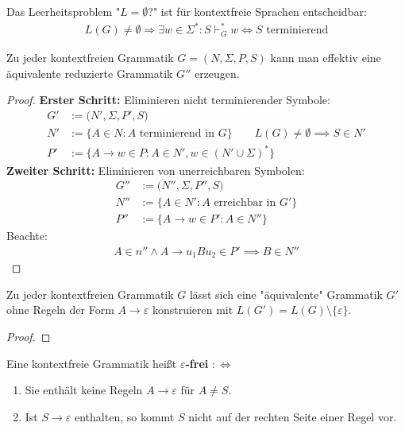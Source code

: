 \begin{satz}\label{satz8.5}
	Das Leerheitsproblem "$L=\emptyset$?" ist für kontextfreie Sprachen entscheidbar:
	\begin{align*}
		L(G)\neq\emptyset\Longrightarrow\exists w\in\Sigma^\ast:S\vdash_G^\ast w
		\Longleftrightarrow S\text{ terminierend}
	\end{align*}
\end{satz}

\begin{lemma}\label{lemma8.6}
	Zu jeder kontextfreien Grammatik $G=(N,\Sigma,P,S)$ kann man effektiv eine äquivalente reduzierte Grammatik $G''$ erzeugen.
\end{lemma}

\begin{proof}
	\textbf{Erster Schritt:} Eliminieren nicht terminierender Symbole:
	\begin{align*}
		G'&:=\big(N',\Sigma,P',S\big)\\
		N'&:=\big\lbrace A\in N:A\text{ terminierend in }G\big\rbrace\qquad L(G)\neq\emptyset\implies S\in N'\\
		P'&:=\big\lbrace A\to w\in P:A\in N',w\in(N'\cup\Sigma)^\ast\big\rbrace
	\end{align*}
	\textbf{Zweiter Schritt:} Eliminieren von unerreichbaren Symbolen:
	\begin{align*}
		G''&:=\big(N'',\Sigma,P'',S\big)\\
		N''&:=\big\lbrace A\in N':A\text{ erreichbar in }G'\big\rbrace\\
		P''&:=\big\lbrace A\to w\in P':A\in N''\big\rbrace
	\end{align*}
	Beachte:
	\begin{align*}
		A\in n''\wedge A\to u_1 Bu_2\in P'\implies B\in N''
	\end{align*}
\end{proof}

\begin{lemma}\label{lemma8.7}
	Zu jeder kontextfreien Grammatik $G$ lässt sich eine "äquivalente" Grammatik $G'$ ohne Regeln der Form $A\to\varepsilon$ konstruieren mit $L(G')=L(G)\setminus\lbrace\varepsilon\rbrace$.
\end{lemma}

\begin{proof}
\end{proof}

\begin{definition}\label{def8.8}
	Eine kontextfreie Grammatik heißt $\varepsilon$\textbf{-frei} $:\Longleftrightarrow$
	\begin{enumerate}[label=\arabic*)]
		\item Sie enthält keine Regeln $A\to\varepsilon$ für $A\neq S$.
		\item Ist $S\to\varepsilon$ enthalten, so kommt $S$ nicht auf der rechten Seite einer Regel vor.
	\end{enumerate}
\end{definition}

